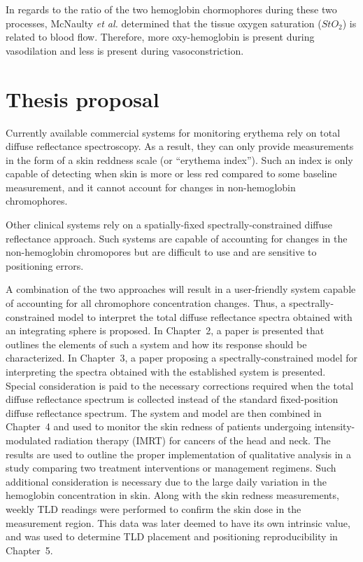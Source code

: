 In regards to the ratio of the two hemoglobin chormophores during these two processes, McNaulty \emph{et al.} determined that the tissue oxygen saturation ($StO_2$) is related to blood flow.\cite{McNulty2011} Therefore, more oxy-hemoglobin is present during vasodilation and less is present during vasoconstriction.



\section{Thesis proposal}
Currently available commercial systems for monitoring erythema rely on total diffuse reflectance spectroscopy. As a result, they can only provide measurements in the form of a skin reddness scale (or ``erythema index''). Such an index is only capable of detecting when skin is more or less red compared to some baseline measurement, and it cannot account for changes in non-hemoglobin chromophores.

Other clinical systems rely on a spatially-fixed spectrally-constrained diffuse reflectance approach. Such systems are capable of accounting for changes in the non-hemoglobin chromopores but are difficult to use and are sensitive to positioning errors.

A combination of the two approaches will result in a user-friendly system capable of accounting for all chromophore concentration changes. Thus, a spectrally-constrained model to interpret the total diffuse reflectance spectra obtained with an integrating sphere is proposed. In Chapter~2, a paper is presented that outlines the elements of such a system and how its response should be characterized. In Chapter~3, a paper proposing a spectrally-constrained model for interpreting the spectra obtained with the established system is presented. Special consideration is paid to the necessary corrections required when the total diffuse reflectance spectrum is collected instead of the standard fixed-position diffuse reflectance spectrum. The system and model are then combined in Chapter~4 and used to monitor the skin redness of patients undergoing intensity-modulated radiation therapy (IMRT) for cancers of the head and neck. The results are used to outline the proper implementation of qualitative analysis in a study comparing two treatment interventions or management regimens. Such additional consideration is necessary due to the large daily variation in the hemoglobin concentration in skin. Along with the skin redness measurements, weekly TLD readings were performed to confirm the skin dose in the measurement region. This data was later deemed to have its own intrinsic value, and was used to determine TLD placement and positioning reproducibility in Chapter~5.
